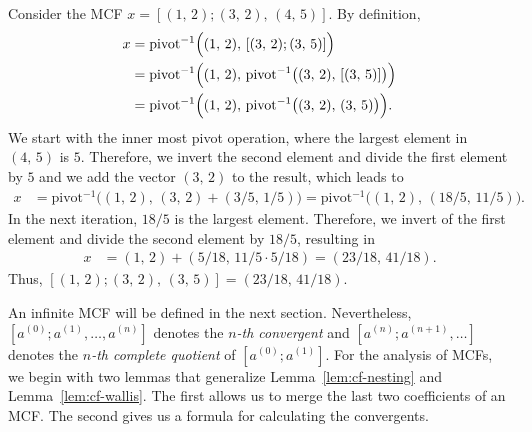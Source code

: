 \begin{example}
  Consider the MCF $x = [(1,\, 2); (3,\, 2),\, (4,\, 5)]$.
  By definition,
  \begin{align*}
    x & = \mathrm{pivot}^{-1}\Bigl((1,\, 2),\, [(3,\, 2); (3,\, 5)]\Bigr) \\
      & = \mathrm{pivot}^{-1}\Bigl((1,\, 2),\, \mathrm{pivot}^{-1}\bigl((3,\, 2),\, [(3,\, 5)]\bigr)\Bigr) \\
      & = \mathrm{pivot}^{-1}\Bigl((1,\, 2),\, \mathrm{pivot}^{-1}\bigl((3,\, 2),\, (3,\, 5)\bigr)\Bigr).
  \end{align*}
  We start with the inner most pivot operation,
  where the largest element in $(4,\, 5)$ is $5$.
  Therefore, we invert the second element and divide the first element by $5$
  and we add the vector $(3,\, 2)$ to the result, which leads to
  \begin{align*}
    x & = \mathrm{pivot}^{-1}\bigl((1,\, 2),\, (3,\, 2) + (3/5,\, 1/5)\bigr)
        = \mathrm{pivot}^{-1}\bigl((1,\, 2),\, (18/5,\, 11/5)\bigr).
  \end{align*}
  In the next iteration, $18/5$ is the largest element.
  Therefore, we invert of the first element and divide the second element by $18/5$,
  resulting in
  \begin{align*}
    x & = (1,\, 2) + (5/18,\, 11/5 · 5/18) = (23/18,\, 41/18).
  \end{align*}
  Thus, $[(1,\, 2); (3,\, 2),\, (3,\, 5)] = (23/18,\, 41/18)$.
\end{example}

\iffalse
The terminology from one-dimensional continued fractions naturally carries over to its multidimensional counterpart.
Given an infinite MCF representation~$[a^{(0)}; a^{(1)}, …]$ of a vector $x ∈ ℝ^d$, we define the following:

\begin{itemize}
  \item The \emph{$k$-th convergent} of $x$ is the finite MCF $[a^{(0)}; a^{(1)}, …, a^{(n)}]$.
  \item The \emph{$k$-th complete quotient} is the MCF $[a^{(n)}; a^{(n+1)}, …]$.
  \item The MCF is \emph{eventually periodic} if there exists an index~$n₀ ≥ 0$
    and a period~$k ≥ 1$ such that $aₙ = a_{n+k}$ and $ℓₙ = ℓ_{n+k}$
    for every $n ≥ n₀$.
    The MCF is \emph{purely periodic} if $n₀ = 0$.
\end{itemize}
\fi

An infinite MCF will be defined in the next section.
Nevertheless, $[a^{(0)}; a^{(1)}, …, a^{(n)}]$ denotes the \emph{$n$-th convergent}
and $[a^{(n)}; a^{(n+1)}, …]$ denotes the \emph{$n$-th complete quotient} of $[a^{(0)}; a^{(1)}]$.
For the analysis of MCFs,
we begin with two lemmas that generalize Lemma~\ref{lem:cf-nesting} and Lemma~\vref{lem:cf-wallis}.
The first allows us to merge the last two coefficients of an MCF.
The second gives us a formula for calculating the convergents.

